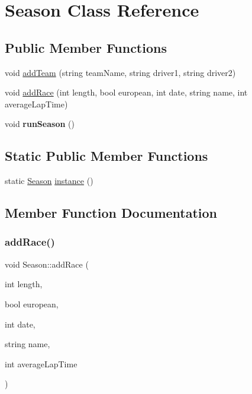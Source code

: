\hypertarget{classSeason}{}\section{Season Class Reference}
\label{classSeason}
\subsection*{Public Member Functions}
\begin{DoxyCompactItemize}
\item 
void \hyperlink{classSeason_a46121f481fc764fa9e480708817442aa}{add\+Team} (string team\+Name, string driver1, string driver2)
\item 
void \hyperlink{classSeason_a6b4c865c1da9ad6ae00b1ce081aed292}{add\+Race} (int length, bool european, int date, string name, int average\+Lap\+Time)
\item 
\mbox{\label{classSeason_ac87bc08315fcfb5a5921e476ff608934}} 
void {\bfseries run\+Season} ()
\end{DoxyCompactItemize}
\subsection*{Static Public Member Functions}
\begin{DoxyCompactItemize}
\item 
static \hyperlink{classSeason}{Season} \hyperlink{classSeason_a6f0fa8d25bd43abc987a25e6f6936fd7}{instance} ()
\end{DoxyCompactItemize}


\subsection{Member Function Documentation}
\mbox{\label{classSeason_a6b4c865c1da9ad6ae00b1ce081aed292}} 
\subsubsection{\texorpdfstring{add\+Race()}{addRace()}}
{\footnotesize\ttfamily void Season\+::add\+Race (\begin{DoxyParamCaption}\item[{int}]{length,  }\item[{bool}]{european,  }\item[{int}]{date,  }\item[{string}]{name,  }\item[{int}]{average\+Lap\+Time }\end{DoxyParamCaption})}


